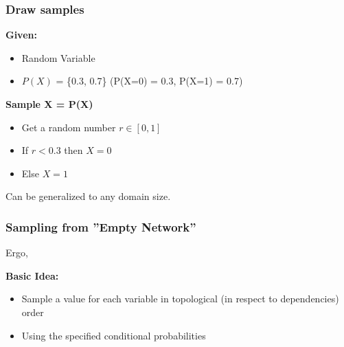 \documentclass[
../../EiKI_Summary.tex,
]
{subfiles}
\begin{document}
\subsubsection*{Draw samples}
\textbf{Given:}
\begin{itemize}
    \item Random Variable 
    \item $P(X)$ = \{0.3, 0.7\} (P(X=0) = 0.3, P(X=1) = 0.7)
\end{itemize}

\textbf{Sample X = P(X)}
\begin{itemize}
    \item Get a random number $r \in [0,1]$
    \item If $r < 0.3$ then $X = 0$
    \item Else $X = 1$ 
\end{itemize}

Can be generalized to any domain size.

\subsubsection*{Sampling from ''Empty Network''}
Ergo, 

\textbf{Basic Idea:}
\begin{itemize}
    \item Sample a value for each variable in topological (in respect to dependencies) order
    \item Using the specified conditional probabilities
\end{itemize}

\begin{codebox*}
    \begin{algorithm}[H]

    \end{algorithm}
\end{codebox*}
\end{document}
